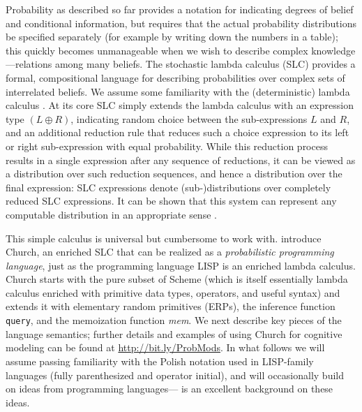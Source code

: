 \documentclass[12pt]{article}
\begin{document}
Probability as described so far provides a notation for indicating degrees of belief and conditional information, but requires that the actual probability distributions be specified separately (for example by writing down the numbers in a table); this quickly becomes unmanageable when we wish to describe complex knowledge---relations among many beliefs. 
The stochastic lambda calculus (SLC) provides a formal, compositional language for describing probabilities over complex sets of interrelated beliefs. 
We assume some familiarity with the (deterministic) lambda calculus \cite{lambda}. 
At its core SLC simply extends the lambda calculus with an expression type $(L \oplus R)$, indicating random choice between the sub-expressions $L$ and $R$, and an additional reduction rule that reduces such a choice expression to its left or right sub-expression with equal probability. 
While this reduction process results in a single expression after any sequence of reductions, it can be viewed as a distribution over such reduction sequences, and hence a distribution over the final expression: SLC expressions denote (sub-)distributions over completely reduced SLC expressions. 
It can be shown that this system can represent any computable distribution in an appropriate sense \cite[see for example][]{PfefferRamsey,FreeRoy}.

This simple calculus is universal but cumbersome to work with. 
\citet{Goodman2008} introduce Church, an enriched SLC that can be realized as a \emph{probabilistic programming language}, just as the programming language LISP is an enriched lambda calculus. 
Church starts with the pure subset of Scheme (which is itself essentially lambda calculus enriched with primitive data types, operators, and useful syntax) and extends it with elementary random primitives (ERPs), the inference function \lstinline{query}, and the memoization function \emph{mem}. 
We next describe key pieces of the language semantics; further details and examples of using Church for cognitive modeling can be found at \url{http://bit.ly/ProbMods}.
In what follows we will assume passing familiarity with the Polish notation used in LISP-family languages (fully parenthesized and operator initial), and will occasionally build on ideas from programming languages---\cite{SICP} is an excellent background on these ideas. 
\end{document}
